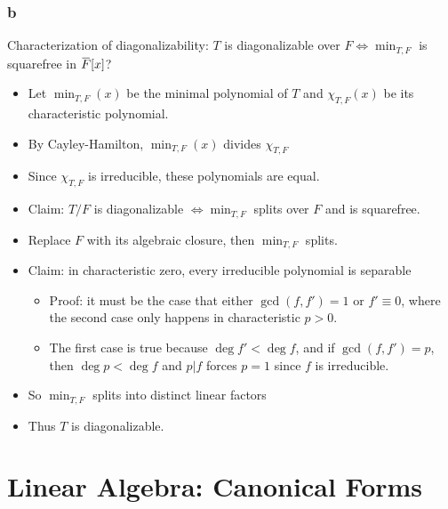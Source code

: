 \begin{solution}
\hypertarget{b-96}{%
\subsubsection{b}\label{b-96}}

Characterization of diagonalizability: \(T\) is diagonalizable over
\(F \iff \min_{T, F}\) is squarefree in
\(\mkern 1.5mu\overline{\mkern-1.5muF\mkern-1.5mu}\mkern 1.5mu[x]\)?

\begin{itemize}
\tightlist
\item
  Let \(\min_{T, F}(x)\) be the minimal polynomial of \(T\) and
  \(\chi_{T, F}(x)\) be its characteristic polynomial.
\item
  By Cayley-Hamilton, \(\min_{T, F}(x)\) divides \(\chi_{T, F}\)
\item
  Since \(\chi_{T, F}\) is irreducible, these polynomials are equal.
\item
  Claim: \(T/F\) is diagonalizable \(\iff \min_{T, F}\) splits over
  \(F\) and is squarefree.
\item
  Replace \(F\) with its algebraic closure, then \(\min_{T, F}\) splits.
\item
  Claim: in characteristic zero, every irreducible polynomial is
  separable

  \begin{itemize}
  \tightlist
  \item
    Proof: it must be the case that either \(\gcd(f, f') = 1\) or
    \(f' \equiv 0\), where the second case only happens in
    characteristic \(p>0\).
  \item
    The first case is true because \(\deg f' < \deg f\), and if
    \(\gcd(f, f') = p\), then \(\deg p < \deg f\) and
    \(p\mathrel{\Big|}f\) forces \(p=1\) since \(f\) is irreducible.
  \end{itemize}
\item
  So \(\min_{T, F}\) splits into distinct linear factors
\item
  Thus \(T\) is diagonalizable.
\end{itemize}

\end{solution}

\hypertarget{linear-algebra-canonical-forms}{%
\section{Linear Algebra: Canonical
Forms}\label{linear-algebra-canonical-forms}}


